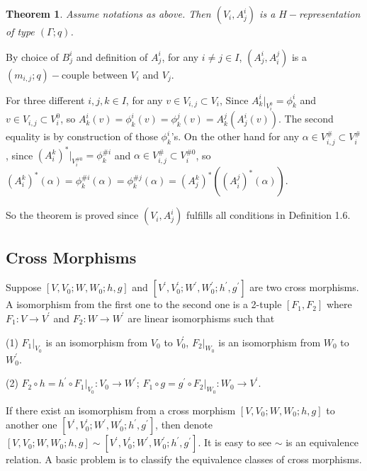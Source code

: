 \def\CTEXPreproc{Created by ctex v0.2.12, don't edit!}\documentclass[11pt]{article}
\newtheorem{thm}{Theorem}[section]
\begin{document}
 \begin{thm} Assume notations as above. Then $(  V_i , A^i _j )$ is a $H-$representation of type $(\Gamma ;q)$.

 \end{thm}

 \begin{pf}
 By choice of $B^i _j$ and definition of $A^i _j$,  for any $i\neq j\in I$, $(A^i _j , A^j _i)$ is a $(m_{i,j};q)-$couple between $V_i$ and $V_j$.

 For three different $i,j,k\in I$, for any $v\in V_{i,j}\subset V_i$, Since $A^i _k |_{V^0 _i}=\phi^i _k $ and $v\in V_{i,j}\subset V^0 _i$, so $A^i _k (v)= \phi^i _k (v) = \phi^j _k (v)= A^j _k ( A^i _j (v)  )$. The second equality is by construction of those $\phi^i _k$'s.
 On the other hand for any $\alpha \in V^{\#}_{i,j} \subset V^{\#}_i$, since $ ( A^k _i )^{*} |_{V^{\# 0}_i } = \phi^{\# i} _k  $ and $\alpha \in V^{\#}_{i,j} \subset V^{\# 0}_i$, so $( A^k _i )^{*}(\alpha )=  \phi^{\# i} _k (\alpha)=  \phi^{\# j} _k (\alpha)
 = ( A^k _j )^{*} ( ( A^j _i )^{*} (\alpha)   )  $.

 So the theorem is proved since $(  V_i , A^i _j )$  fulfills all conditions in Definition 1.6.
 \end{pf}



\subsection{Cross Morphisms}


Suppose  $[V, V_0 ; W, W_0 ; h,g   ]$ and $[V^{'}, V^{'}_0 ; W^{'}, W^{'}_0 ; h^{'},g^{'}   ]$ are two cross  morphisms. A isomorphism from the first one to the second one is a 2-tuple  $[ F_1 , F_2  ]$ where $F_1 : V\rightarrow V^{'} $
and $F_2 : W\rightarrow W^{'}$ are linear isomorphisms such that

\noindent(1) $F_1 |_{V_0}  $ is an isomorphism from $V_0$ to $V^{'}_0 $, $F_2 |_{W_0}  $ is an isomorphism from $W_0$ to $W^{'}_0 $.

\noindent(2) $F_2 \circ h = h^{'} \circ F_1 |_{V_0 } : V_0 \rightarrow W^{'}   $; $F_1 \circ g = g^{'} \circ F_2 |_{W_0 } : W_0 \rightarrow V^{'}   $.

If there exist an isomorphism from a cross morphism $[V, V_0 ; W, W_0 ; h,g   ]$ to another one
$[V^{'}, V^{'}_0 ; W^{'}, W^{'}_0 ; h^{'},g^{'}   ]$, then denote $[V, V_0 ; W, W_0 ; h,g   ]\sim [V^{'}, V^{'}_0 ; W^{'}, W^{'}_0 ; h^{'},g^{'}]   $. It is easy to see $\sim$ is an equivalence relation. A basic problem is to classify the equivalence classes of cross  morphisms.\\
\end{document}
